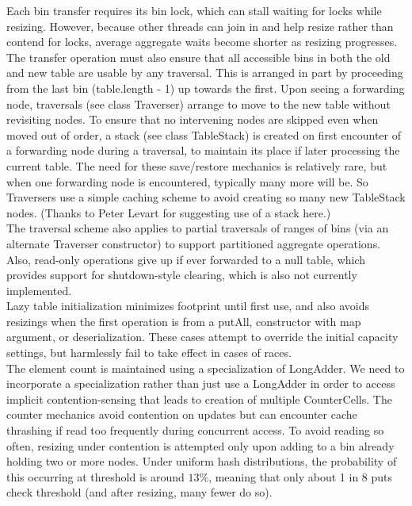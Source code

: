 \documentclass[UTF8,11pt]{ctexbook}
\begin{document}
	Each bin transfer requires its bin lock, which can stall
	waiting for locks while resizing. However, because other
	threads can join in and help resize rather than contend for
	locks, average aggregate waits become shorter as resizing
	progresses.  The transfer operation must also ensure that all
	accessible bins in both the old and new table are usable by any
	traversal.  This is arranged in part by proceeding from the
	last bin (table.length - 1) up towards the first.  Upon seeing
	a forwarding node, traversals (see class Traverser) arrange to
	move to the new table without revisiting nodes.  To ensure that
	no intervening nodes are skipped even when moved out of order,
	a stack (see class TableStack) is created on first encounter of
	a forwarding node during a traversal, to maintain its place if
	later processing the current table. The need for these
	save/restore mechanics is relatively rare, but when one
	forwarding node is encountered, typically many more will be.
	So Traversers use a simple caching scheme to avoid creating so
	many new TableStack nodes. (Thanks to Peter Levart for
	suggesting use of a stack here.)\\
	
	The traversal scheme also applies to partial traversals of
	ranges of bins (via an alternate Traverser constructor)
	to support partitioned aggregate operations.  Also, read-only
	operations give up if ever forwarded to a null table, which
	provides support for shutdown-style clearing, which is also not
	currently implemented.\\
	
	Lazy table initialization minimizes footprint until first use,
	and also avoids resizings when the first operation is from a
	putAll, constructor with map argument, or deserialization.
	These cases attempt to override the initial capacity settings,
	but harmlessly fail to take effect in cases of races.\\
	
	The element count is maintained using a specialization of
	LongAdder. We need to incorporate a specialization rather than
	just use a LongAdder in order to access implicit
	contention-sensing that leads to creation of multiple
	CounterCells.  The counter mechanics avoid contention on
	updates but can encounter cache thrashing if read too
	frequently during concurrent access. To avoid reading so often,
	resizing under contention is attempted only upon adding to a
	bin already holding two or more nodes. Under uniform hash
	distributions, the probability of this occurring at threshold
	is around $13\%$, meaning that only about 1 in 8 puts check
	threshold (and after resizing, many fewer do so).\\
	
\end{document}
